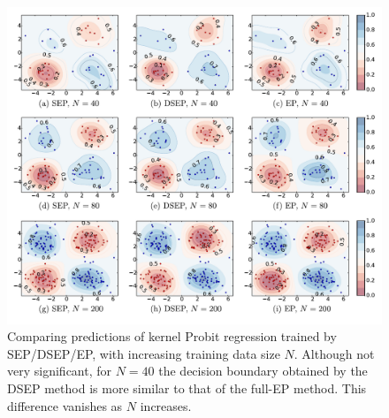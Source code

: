 \begin{table} 
\small
\centering
 \caption{ Average test results of all methods on kernel probit regression.}
  \label{tab:kernel} 
 \end{table} 

\begin{figure}
\centering
\includegraphics[width=1\linewidth]{Chapter3/sep/fig/increase_n_kernel}
\caption{Comparing predictions of kernel Probit regression trained by SEP/DSEP/EP, with increasing training data size $N$. Although not very significant, for $N=40$ the decision boundary obtained by the DSEP method is more similar to that of the full-EP method. This difference vanishes as $N$ increases. }
\label{fig:kernel_increase_n}
\end{figure}

